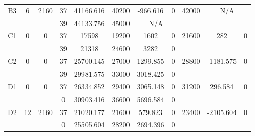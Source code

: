 \begin{sidewaystable}
\begin{tabular}{c||c|c||c|c|c|c|c||c|c|c}
         &
        
      \\
      \hline
      \multirow{2}{*}{B3} &
      \multirow{2}{*}{6} &
      \multirow{2}{*}{2160} &
      37 &
      41166.616 &
      40200 &
        -966.616 &
        0 &
      \multirow{2}{*}{42000} &
        \multicolumn{2}{c}{\multirow{2}{*}{N/A}}
      \\
      \cline{4-8}
       &
       &
       &
      39 &
      44133.756 &
      45000 &
        \multicolumn{2}{|c||}{N/A} &
      
        
      \\
      \hline
      \multirow{2}{*}{C1} &
      \multirow{2}{*}{0} &
      \multirow{2}{*}{0} &
      37 &
      17598 &
      19200 &
        1602 &
        0 &
      \multirow{2}{*}{21600} &
        \multirow{2}{*}{282} &
        \multirow{2}{*}{0}
      \\
      \cline{4-8}
       &
       &
       &
      39 &
      21318 &
      24600 &
        3282 &
        0 &
      
         &
        
      \\
      \hline
      \multirow{2}{*}{C2} &
      \multirow{2}{*}{0} &
      \multirow{2}{*}{0} &
      37 &
      25700.145 &
      27000 &
        1299.855 &
        0 &
      \multirow{2}{*}{28800} &
        \multirow{2}{*}{-1181.575} &
        \multirow{2}{*}{0}
      \\
      \cline{4-8}
       &
       &
       &
      39 &
      29981.575 &
      33000 &
        3018.425 &
        0 &
      
         &
        
      \\
      \hline
      \multirow{2}{*}{D1} &
      \multirow{2}{*}{0} &
      \multirow{2}{*}{0} &
      37 &
      26334.852 &
      29400 &
        3065.148 &
        0 &
      \multirow{2}{*}{31200} &
        \multirow{2}{*}{296.584} &
        \multirow{2}{*}{0}
      \\
      \cline{4-8}
       &
       &
       &
      0 &
      30903.416 &
      36600 &
        5696.584 &
        0 &
      
         &
        
      \\
      \hline
      \multirow{2}{*}{D2} &
      \multirow{2}{*}{12} &
      \multirow{2}{*}{2160} &
      37 &
      21020.177 &
      21600 &
        579.823 &
        0 &
      \multirow{2}{*}{23400} &
        \multirow{2}{*}{-2105.604} &
        \multirow{2}{*}{0}
      \\
      \cline{4-8}
       &
       &
       &
      0 &
      25505.604 &
      28200 &
        2694.396 &
        0 &
      

\end{tabular}
\end{sidewaystable}
